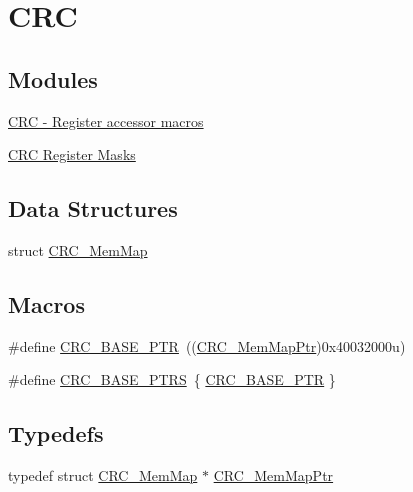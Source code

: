 \hypertarget{group___c_r_c___peripheral}{}\section{C\+R\+C}
\label{group___c_r_c___peripheral}
\subsection*{Modules}
\begin{DoxyCompactItemize}
\item 
\hyperlink{group___c_r_c___register___accessor___macros}{C\+R\+C -\/ Register accessor macros}
\item 
\hyperlink{group___c_r_c___register___masks}{C\+R\+C Register Masks}
\end{DoxyCompactItemize}
\subsection*{Data Structures}
\begin{DoxyCompactItemize}
\item 
struct \hyperlink{struct_c_r_c___mem_map}{C\+R\+C\+\_\+\+Mem\+Map}
\end{DoxyCompactItemize}
\subsection*{Macros}
\begin{DoxyCompactItemize}
\item 
\#define \hyperlink{group___c_r_c___peripheral_ga139bd4056b9e3c7987d28b6e955b662d}{C\+R\+C\+\_\+\+B\+A\+S\+E\+\_\+\+P\+T\+R}~((\hyperlink{group___c_r_c___peripheral_ga65ec00368ee39504a8a83cd736901b84}{C\+R\+C\+\_\+\+Mem\+Map\+Ptr})0x40032000u)
\item 
\#define \hyperlink{group___c_r_c___peripheral_ga0532d18a8549a09065845e5210ca6876}{C\+R\+C\+\_\+\+B\+A\+S\+E\+\_\+\+P\+T\+R\+S}~\{ \hyperlink{group___c_r_c___peripheral_ga139bd4056b9e3c7987d28b6e955b662d}{C\+R\+C\+\_\+\+B\+A\+S\+E\+\_\+\+P\+T\+R} \}
\end{DoxyCompactItemize}
\subsection*{Typedefs}
\begin{DoxyCompactItemize}
\item 
typedef struct \hyperlink{struct_c_r_c___mem_map}{C\+R\+C\+\_\+\+Mem\+Map} $\ast$ \hyperlink{group___c_r_c___peripheral_ga65ec00368ee39504a8a83cd736901b84}{C\+R\+C\+\_\+\+Mem\+Map\+Ptr}
\end{DoxyCompactItemize}


